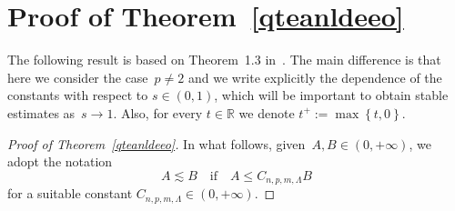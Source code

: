 \documentclass[12pt]{article}
\newcommand{\R}{\mathbb{R}}
\numberwithin{equation}{section}
\renewcommand{\leq}{\leqslant}
\begin{document}
\section{Proof of Theorem~\ref{qteanldeeo}}\label{motifenzi}
The following result is based on Theorem~1.3 in~\cite{MR3133422}. The main difference is that here we consider the case~$p\neq 2$ and we write explicitly the dependence of the constants with respect to $s\in(0,1)$, which will be important
to obtain stable estimates as~$s\to1$.  Also, for every $t\in\R$ we denote $t^{+}:=\max \left\lbrace t,0 \right\rbrace$. 



\begin{proof}[Proof of Theorem~\ref{qteanldeeo}]
In what follows, given~$A,B\in(0,+\infty)$, we adopt the notation 
\begin{equation*}
A\lesssim B \quad\mbox{if}\quad A\leq C_{n,p,m,\Lambda}B
\end{equation*}
for a suitable constant $C_{n,p,m,\Lambda}\in (0,+\infty)$.
 

\end{proof}
\end{document}
